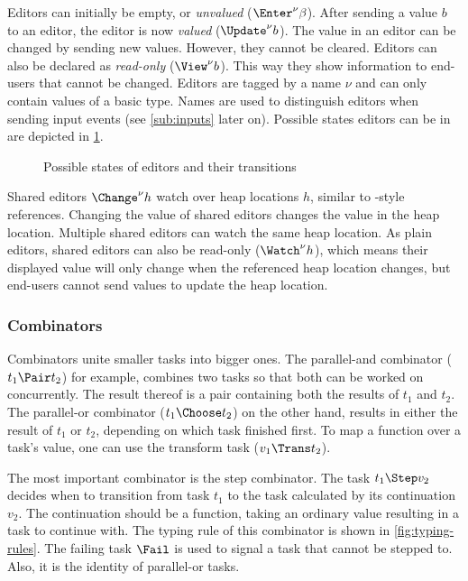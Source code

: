 Editors can initially be empty, or \emph{unvalued} ($\Enter^\nu \beta$).
After sending a value $b$ to an editor, the editor is now \emph{valued} ($\Update^\nu b$).
The value in an editor can be changed by sending new values.
However, they cannot be cleared.
Editors can also be declared as \emph{read-only} ($\View^\nu b$).
This way they show information to end-users that cannot be changed.
Editors are tagged by a name $\nu$
and can only contain values of a basic type.
Names are used to distinguish editors when sending input events (see \cref{sub:inputs} later on).
Possible states editors can be in are depicted in \cref{fig:editor-state}.

\begin{figure}
  
  \caption{Possible states of editors and their transitions}
  \label{fig:editor-state}
\end{figure}

Shared editors $\Change^\nu h$ watch over heap locations $h$,
similar to \ML-style references.
Changing the value of shared editors changes the value in the heap location.
Multiple shared editors can watch the same heap location.
As plain editors, shared editors can also be read-only ($\Watch^\nu h$),
which means their displayed value will only change when the referenced heap location changes,
but end-users cannot send values to update the heap location.


\subsubsection{Combinators}

Combinators unite smaller tasks into bigger ones.
The parallel-and combinator ($t_1 \Pair t_2$) for example,
combines two tasks so that both can be worked on concurrently.
The result thereof is a pair containing both the results of $t_1$ and $t_2$.
The parallel-or combinator ($t_1 \Choose t_2$) on the other hand,
results in either the result of $t_1$ or $t_2$,
depending on which task finished first.
To map a function over a task's value,
one can use the transform task ($v_1 \Trans t_2$).

The most important combinator is the step combinator.
The task $t_1 \Step v_2$ decides when to transition from task $t_1$
to the task calculated by its continuation $v_2$.
The continuation should be a function, taking an ordinary value resulting in a task to continue with.
The typing rule of this combinator is shown in \cref{fig:typing-rules}.
The failing task $\Fail$ is used to signal a task that cannot be stepped to.
Also, it is the identity of parallel-or tasks.

